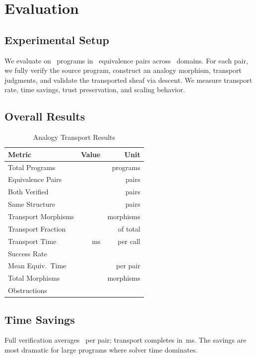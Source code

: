 \documentclass[11pt]{article}
\begin{document}
\section{Evaluation}\label{sec:evaluation}

\subsection{Experimental Setup}
We evaluate on \compTotalPrograms\ programs in \compEquivPairs\
equivalence pairs across \expDomainCount\ domains.  For each pair,
we fully verify the source program, construct an analogy morphism,
transport judgments, and validate the transported sheaf via descent.
We measure transport rate, time savings, trust preservation, and
scaling behavior.

\subsection{Overall Results}

\begin{table}[H]
\centering
\caption{Analogy Transport Results}
\label{tab:transport-results}
\begin{tabular}{lrr}
\toprule
\textbf{Metric} & \textbf{Value} & \textbf{Unit} \\
\midrule
Total Programs & \compTotalPrograms & programs \\
Equivalence Pairs & \compEquivPairs & pairs \\
Both Verified & \compEquivBothVerified & pairs \\
Same Structure & \compEquivSameStructure & pairs \\
Transport Morphisms & \compMorphTransport & morphisms \\
Transport Fraction & \compMorphTransportPct & of total \\
Transport Time & \compProfAnalogyTransportMeanMs\,ms & per call \\
Success Rate & \compProfAnalogyTransportRate & \\
Mean Equiv.\ Time & \compEquivMeanTime & per pair \\
Total Morphisms & \compMorphTotal & morphisms \\
Obstructions & \compObstructionTotal & \\
\bottomrule
\end{tabular}
\end{table}

\subsection{Time Savings}
Full verification averages \compEquivMeanTime\ per pair; transport
completes in \compProfAnalogyTransportMeanMs\,ms.  The savings are
most dramatic for large programs where solver time dominates.
\end{document}
